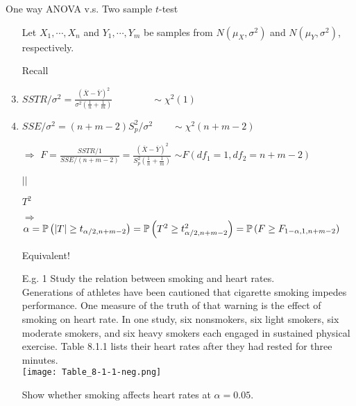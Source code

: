 \begin{frame}[fragile]{One way ANOVA v.s. Two sample $t$-test}
\begin{enumerate}
	\item[] Let $X_1,\cdots, X_n$ and $Y_1,\cdots, Y_m$ be samples from $N(\mu_X,\sigma^2)$ and $N(\mu_Y,\sigma^2)$, respectively.
		\vfill
	\item[Recall]
	\item $\displaystyle SSTR/\sigma^2 = \frac{\left(\overline{X}-\overline{Y}\right)^2}{\sigma^2\left(\frac 1n+\frac 1m\right)}\hspace{4em}\sim \chi^2(1)$
	\item $SSE/\sigma^2 = (n+m-2)S_p^2/\sigma^2\hspace{2em}\sim\chi^2(n+m-2)$
		\vfill
	\item[$\Longrightarrow$] $\displaystyle F= \frac{SSTR/1}{SSE/(n+m-2)}=\frac{\left(\overline{X}-\overline{Y}\right)^2}{S_p^2\left(\frac 1n+\frac 1m\right)} $ $\sim F(df_1=1,df_2=n+m-2)$
	\item[] \hspace{14em}$||$
	\item[] \hspace{14em}$T^2$
		\vfill
\item[$\Longrightarrow$]
		$\alpha = \mathbb{P}\left(|T|\ge t_{\alpha/2,n+m-2} \right )
		= \mathbb{P}\left(T^2\ge t_{\alpha/2,n+m-2}^2 \right )
		=  \mathbb{P}\left( F \ge F_{1-\alpha,1,n+m-2} \right)$
\item[]\phantom{a}
	\begin{center}
	Equivalent!
	\end{center}
\end{enumerate}
\end{frame}
\begin{frame}
	\begin{enumerate}
		\item[E.g. 1] Study the relation between smoking and heart rates.\\[1em]
Generations of athletes have been cautioned that cigarette smoking impedes
performance. One measure of the truth of that warning is the effect of smoking
on heart rate. In one study, six nonsmokers, six light smokers, six moderate
smokers, and six heavy smokers each engaged in sustained physical exercise.
Table 8.1.1 lists their heart rates after they had rested for three minutes.
\\[1em]
\texttt{[image: Table\_8-1-1-neg.png]}
\item[] Show whether smoking affects heart rates at $\alpha=0.05$.
	\end{enumerate}
\end{frame}
